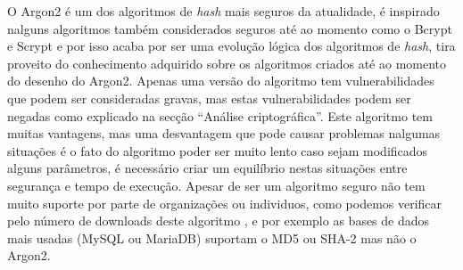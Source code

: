 \documentclass[conference]{IEEEtran}
\begin{document}
O Argon2 é um dos algoritmos de \textit{hash} mais seguros da atualidade, é inspirado nalguns 
algoritmos também considerados seguros até ao momento como o Bcrypt e Scrypt e por isso 
acaba por ser uma evolução lógica dos algoritmos de \textit{hash}, tira proveito do conhecimento 
adquirido sobre os algoritmos criados até ao momento do desenho do Argon2. Apenas uma versão do algoritmo tem 
vulnerabilidades que podem ser consideradas gravas, mas estas vulnerabilidades podem ser 
negadas como explicado na secção “Análise criptográfica”. Este algoritmo tem muitas 
vantagens, mas uma desvantagem que pode causar problemas nalgumas situações é o fato do 
algoritmo poder ser muito lento caso sejam modificados alguns parâmetros, é necessário 
criar um equilíbrio nestas situações entre segurança e tempo de execução. Apesar de ser 
um algoritmo seguro não tem muito suporte por parte de organizações ou individuos, como podemos
verificar pelo número de downloads deste algoritmo \cite{hashtrends}, e por exemplo as bases 
de dados mais usadas (MySQL ou MariaDB) suportam o MD5 ou SHA-2 mas não o Argon2.



\end{document}
